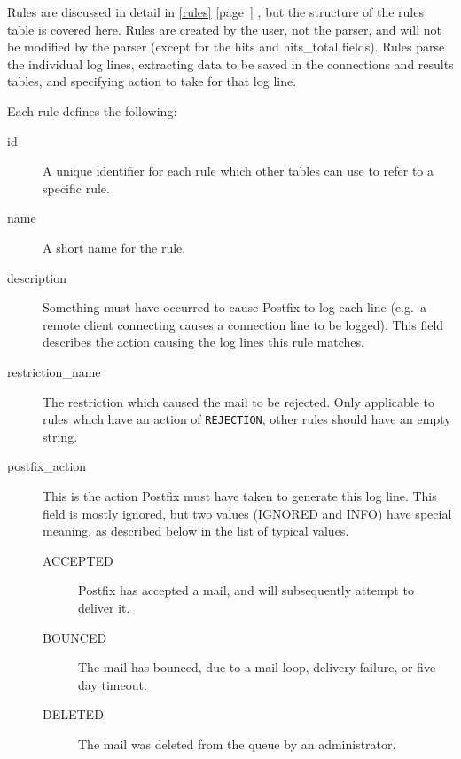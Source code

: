 \documentclass[a4paper,12pt,draft]{article}
\newcommand{\refwithpage}[1]{%
    \empty{}\ref{#1} [page~\pageref{#1}]%
}
\newcommand{\sectionref}[1]{%
    \textsection{}\refwithpage{#1}%
}
\begin{document}
Rules are discussed in detail in \sectionref{rules}, but the structure of
the rules table is covered here.  Rules are created by the user, not the
parser, and will not be modified by the parser (except for the hits and
hits\_total fields).  Rules parse the individual log lines, extracting data
to be saved in the connections and results tables, and specifying action to
take for that log line.

Each rule defines the following:

\begin{description}

    \item [id] A unique identifier for each rule which other tables can use
        to refer to a specific rule.

    \item [name] A short name for the rule.

    \item [description] Something must have occurred to cause Postfix to
        log each line (e.g.\ a remote client connecting causes a connection
        line to be logged).  This field describes the action causing the
        log lines this rule matches.

    \item [restriction\_name] The restriction which caused the mail to be
        rejected.  Only applicable to rules which have an action of
        \texttt{REJECTION}, other rules should have an empty string.

    \item [postfix\_action] This is the action Postfix must have taken to
        generate this log line.  This field is mostly ignored, but two
        values (IGNORED and INFO) have special meaning, as described below
        in the list of typical values.\label{postfix_action}

        \begin{description}

            \item [ACCEPTED] Postfix has accepted a mail, and will
                subsequently attempt to deliver it.

            \item [BOUNCED] The mail has bounced, due to a mail loop,
                delivery failure, or five day timeout.

            \item [DELETED] The mail was deleted from the queue by an
                administrator.


\end{description}
\end{description}
\end{document}

